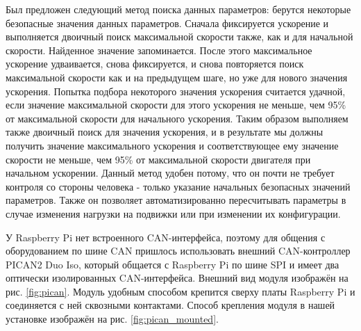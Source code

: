 \documentclass[14pt,russian,a4paper]{extarticle}
\newcounter{subsubsubsection}[subsubsection]
\begin{document}
Был предложен следующий метод поиска данных параметров: берутся некоторые безопасные значения данных параметров. Сначала фиксируется ускорение и выполняется двоичный поиск максимальной скорости также, как и для начальной скорости. Найденное значение запоминается. После этого максимальное ускорение удваивается, снова фиксируется, и снова повторяется поиск максимальной скорости как и на предыдущем шаге, но уже для нового значения ускорения. Попытка подбора некоторого значения ускорения считается удачной, если значение максимальной скорости для этого ускорения не меньше, чем 95\% от максимальной скорости для начального ускорения. Таким образом выполняем также двоичный поиск для значения ускорения, и в результате мы должны получить значение максимального ускорения и соответствующее ему значение скорости не меньше, чем 95\% от максимальной скорости двигателя при начальном ускорении. Данный метод удобен потому, что он почти не требует контроля со стороны человека - только указание начальных безопасных значений параметров. Также он позволяет автоматизированно пересчитывать параметры в случае изменения нагрузки на подвижки или при изменении их конфигурации.

У Raspberry Pi нет встроенного CAN-интерфейса, поэтому для общения с оборудованием по шине CAN пришлось использовать внешний CAN-контроллер PICAN2 Duo Iso, который общается с Raspberry Pi по шине SPI и имеет два оптически изолированных CAN-интерфейса. Внешний вид модуля изображён на рис. \ref{fig:pican}. Модуль удобным способом крепится сверху платы Raspberry Pi и соединяется с ней сквозными контактами. Способ крепления модуля в нашей установке изображён на рис. \ref{fig:pican_mounted}.
\end{document}
